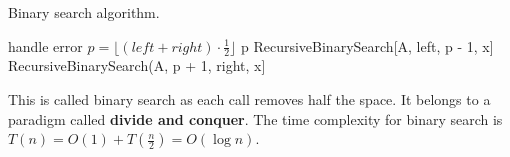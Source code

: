 \begin{algorithm}
    \caption{Binary search algorithm.}
    \label{alg:binary_search}
    \begin{algorithmic}[1]
                \State handle error
            \EndIf
            \State $p = \lfloor (left + right) \cdot \frac{1}{2} \rfloor$
                \State \Return p
                \State RecursiveBinarySearch[A, left, p - 1, x]
            \Else
                \State RecursiveBinarySearch(A, p + 1, right, x]
            \EndIf
        \EndProcedure
    \end{algorithmic}
\end{algorithm}

This is called binary search as each call removes half the space. It belongs to a paradigm called \textbf{divide and conquer}. The time complexity for binary search is $T(n) = O(1) + T(\frac{n}{2}) = O(\log{n})$.

